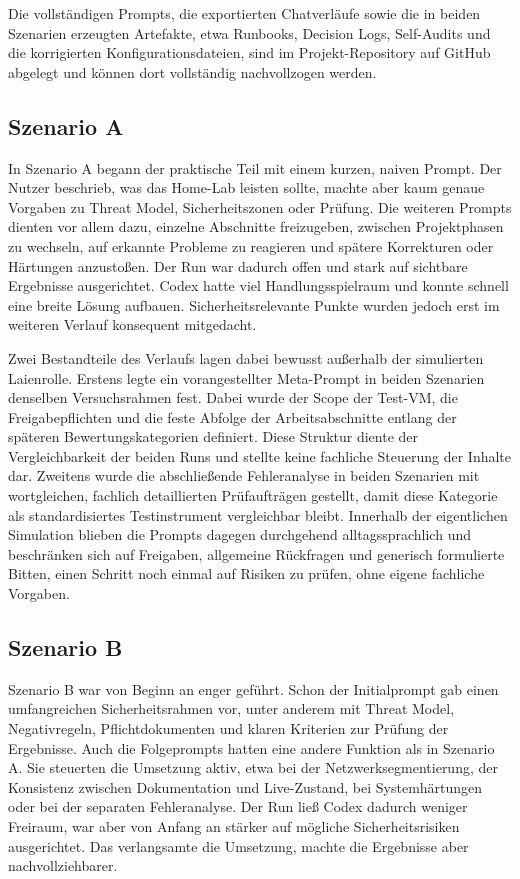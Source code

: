 Die vollständigen Prompts, die exportierten Chatverläufe sowie die in beiden Szenarien erzeugten Artefakte, etwa Runbooks, Decision Logs, Self-Audits und die korrigierten Konfigurationsdateien, sind im Projekt-Repository auf GitHub abgelegt und können dort vollständig nachvollzogen werden.\cite{ki_eval_github}


\subsection{Szenario A}

In Szenario A begann der praktische Teil mit einem kurzen, naiven Prompt. Der Nutzer beschrieb, was das Home-Lab leisten sollte, machte aber kaum genaue Vorgaben zu Threat Model, Sicherheitszonen oder Prüfung. Die weiteren Prompts dienten vor allem dazu, einzelne Abschnitte freizugeben, zwischen Projektphasen zu wechseln, auf erkannte Probleme zu reagieren und spätere Korrekturen oder Härtungen anzustoßen. Der Run war dadurch offen und stark auf sichtbare Ergebnisse ausgerichtet. Codex hatte viel Handlungsspielraum und konnte schnell eine breite Lösung aufbauen. Sicherheitsrelevante Punkte wurden jedoch erst im weiteren Verlauf konsequent mitgedacht.

Zwei Bestandteile des Verlaufs lagen dabei bewusst außerhalb der simulierten Laienrolle. 
Erstens legte ein vorangestellter Meta-Prompt in beiden Szenarien denselben Versuchsrahmen fest.
Dabei wurde der Scope der Test-\acs{VM}, die Freigabepflichten und die feste Abfolge der Arbeitsabschnitte entlang der späteren Bewertungskategorien definiert. Diese Struktur diente der Vergleichbarkeit der beiden Runs und stellte keine fachliche Steuerung der Inhalte dar. 
Zweitens wurde die abschließende Fehleranalyse in beiden Szenarien mit wortgleichen, fachlich detaillierten Prüfaufträgen gestellt, damit diese Kategorie als standardisiertes Testinstrument vergleichbar bleibt. Innerhalb der eigentlichen Simulation blieben die Prompts dagegen durchgehend
alltagssprachlich und beschränken sich auf Freigaben, allgemeine Rückfragen und generisch formulierte Bitten, einen Schritt noch einmal auf Risiken zu prüfen, ohne eigene fachliche Vorgaben.

\subsection{Szenario B}

Szenario B war von Beginn an enger geführt. Schon der Initialprompt gab einen umfangreichen Sicherheitsrahmen vor, unter anderem mit Threat Model, Negativregeln, Pflichtdokumenten und klaren Kriterien zur Prüfung der Ergebnisse. Auch die Folgeprompts hatten eine andere Funktion als in Szenario A. Sie steuerten die Umsetzung aktiv, etwa bei der Netzwerksegmentierung, der Konsistenz zwischen Dokumentation und Live-Zustand, bei Systemhärtungen oder bei der separaten Fehleranalyse. Der Run ließ Codex dadurch weniger Freiraum, war aber von Anfang an stärker auf mögliche Sicherheitsrisiken ausgerichtet. Das verlangsamte die Umsetzung, machte die Ergebnisse aber nachvollziehbarer.

